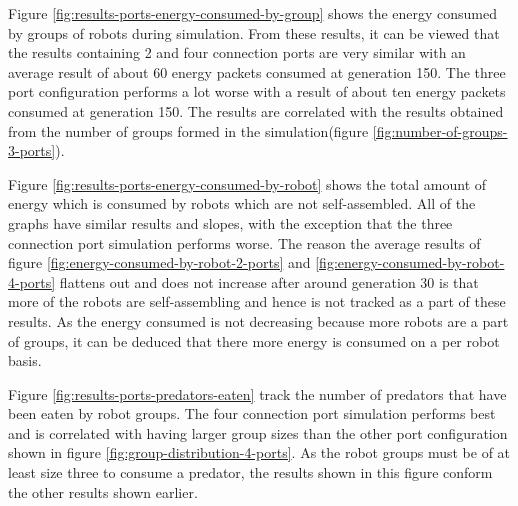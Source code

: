 Figure \ref{fig:results-ports-energy-consumed-by-group} shows the energy consumed by groups of robots during simulation.
From these results, it can be viewed that the results containing 2 and four connection ports are very similar with an average result of about 60 energy packets consumed at generation 150.
The three port configuration performs a lot worse with a result of about ten energy packets consumed at generation 150.
The results are correlated with the results obtained from the number of groups formed in the simulation(figure \ref{fig:number-of-groups-3-ports}).


\vspace*{\fill}
\newpage
\vspace*{\fill}



Figure \ref{fig:results-ports-energy-consumed-by-robot} shows the total amount of energy which is consumed by robots which are not self-assembled.
All of the graphs have similar results and slopes, with the exception that the three connection port simulation performs worse.
The reason the average results of figure \ref{fig:energy-consumed-by-robot-2-ports} and \ref{fig:energy-consumed-by-robot-4-ports} flattens out and does not increase after around generation 30 is that more of the robots are self-assembling and hence is not tracked as a part of these results.
As the energy consumed is not decreasing because more robots are a part of groups, it can be deduced that there more energy is consumed on a per robot basis.

\vspace*{\fill}
\newpage
\vspace*{\fill}



Figure \ref{fig:results-ports-predators-eaten} track the number of predators that have been eaten by robot groups. 
The four connection port simulation performs best and is correlated with having larger group sizes than the other port configuration shown in figure \ref{fig:group-distribution-4-ports}.
As the robot groups must be of at least size three to consume a predator, the results shown in this figure conform the other results shown earlier.

\vspace*{\fill}
